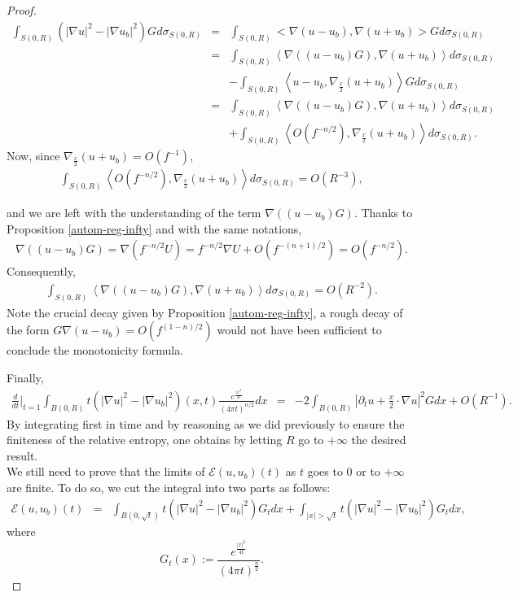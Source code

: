 \documentclass[a4paper,11pt,reqno]{amsart}
\begin{document}
\begin{proof}
\begin{eqnarray*}
\int_{S(0,R)}(|\nabla u|^2-|\nabla u_b|^2)Gd\sigma_{S(0,R)}&=&\int_{S(0,R)}<\nabla (u-u_b),\nabla (u+u_b)>Gd\sigma_{S(0,R)}\\
&=&\int_{S(0,R)}\left<\nabla ((u-u_b)G),\nabla (u+u_b)\right>d\sigma_{S(0,R)}\\
&&-\int_{S(0,R)}\left<u-u_b,\nabla_{\frac{x}{2}} (u+u_b)\right>Gd\sigma_{S(0,R)}\\
&=&\int_{S(0,R)}\left<\nabla ((u-u_b)G),\nabla (u+u_b)\right>d\sigma_{S(0,R)}\\
&&+\int_{S(0,R)}\left<\textit{O}(f^{-n/2}),\nabla_{\frac{x}{2}} (u+u_b)\right>d\sigma_{S(0,R)}.
\end{eqnarray*}
Now, since $\nabla_{\frac{x}{2}} (u+u_b)=\textit{O}(f^{-1})$, 
\begin{eqnarray*}
\int_{S(0,R)}\left<\textit{O}(f^{-n/2}),\nabla_{\frac{x}{2}} (u+u_b)\right>d\sigma_{S(0,R)}=\textit{O}(R^{-3}),
\end{eqnarray*}

and we are left with the understanding of the term $\nabla ((u-u_b)G)$. Thanks to Proposition \ref{autom-reg-infty} and with the same notations, 
\begin{eqnarray*}
\nabla ((u-u_b)G)=\nabla (f^{-n/2}U)=f^{-n/2}\nabla U+\textit{O}(f^{-(n+1)/2})=\textit{O}(f^{-n/2}).
\end{eqnarray*}
Consequently,
\begin{eqnarray*}
\int_{S(0,R)}\left<\nabla ((u-u_b)G),\nabla (u+u_b)\right>d\sigma_{S(0,R)}=\textit{O}(R^{-2}).
\end{eqnarray*}
Note the crucial decay given by Proposition \ref{autom-reg-infty}, a rough decay of the form $G\nabla (u-u_b)=\textit{O}(f^{(1-n)/2})$ would not have been sufficient to conclude the monotonicity formula.

Finally, 
\begin{eqnarray*}
\frac{d}{dt}\bigg\rvert_{t=1}\int_{B(0,R)}t(|\nabla u|^2-|\nabla u_b|^2)(x,t)\frac{e^{\frac{|x|^2}{4t}}}{(4\pi t)^{n/2}}dx&=&
-2\int_{B(0,R)}\left|\partial_tu+\frac{x}{2}\cdot\nabla u\right|^2Gdx+\textit{O}\left(R^{-1}\right).
\end{eqnarray*}
By integrating first in time and by reasoning as we did previously to ensure the finiteness of the relative entropy, one obtains by letting $R$ go to $+\infty$ the desired result.\\

We still need to prove that the limits of $\mathcal{E}(u,u_b)(t)$ as $t$ goes to $0$ or to $+\infty$ are finite. To do so, we cut the integral into two parts as follows:
\begin{eqnarray*}
\mathcal{E}(u,u_b)(t)&=&\int_{B(0,\sqrt{t})}t(|\nabla u|^2-|\nabla u_b|^2)G_tdx+\int_{|x|>\sqrt{t}}t(|\nabla u|^2-|\nabla u_b|^2)G_tdx,
\end{eqnarray*}
where $$G_t(x):=\frac{e^{\frac{|x|^2}{4t}}}{(4\pi t)^{\frac{n}{2}}}.$$


\end{proof}
\end{document}
